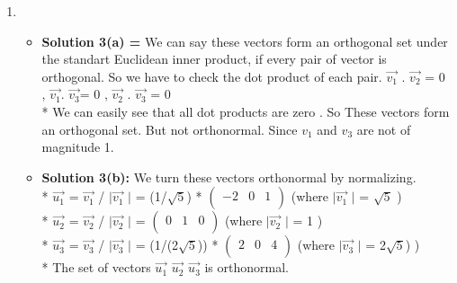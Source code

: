 \documentclass[11pt]{article}
\begin{document}
\begin{enumerate}
\item 
\begin{itemize}
    \item \textbf{Solution 3(a) = } We can say these vectors form an orthogonal set under the standart Euclidean inner product, if every pair of vector is orthogonal. So we have to check the dot product of each pair. $\vec{v_1}$ . $\vec{v_2}$ = 0 , $\vec{v_1}$. $\vec{v_3}$= 0 , $\vec{v_2}$ . $\vec{v_3}$ = 0 
    \\* We can easily see that all dot products are zero . So These vectors form an orthogonal set. But not orthonormal. Since  $v_1$ and $v_3$ are not of magnitude 1. 
    \item \textbf{Solution 3(b):} We turn these vectors orthonormal by normalizing. 
    \\* $\vec{u_1}$ =  $\vec{v_1}$  / $\mid \vec{v_1} $ $\mid$ = (1/$\sqrt{5}$) * 
$\begin  {pmatrix}
-2&0&1\\
\end{pmatrix}
$      (where $\mid \vec{v_1} $ $\mid$ = $\sqrt{5}$ )
    \\* $\vec{u_2}$ =  $\vec{v_2}$ / $\mid \vec{v_2} $ $\mid$ = $\begin  {pmatrix}
0&1&0\\
\end{pmatrix}
$  (where $\mid \vec{v_2} $ $\mid$ = 1 )
    \\* $\vec{u_3}$ =  $\vec{v_3}$ / $\mid \vec{v_3} $ $\mid$ = (1/(2$\sqrt{5}$)) * 
    $\begin  {pmatrix}
2&0&4\\
\end{pmatrix}
$  (where $\mid \vec{v_3} $ $\mid$ = 2$\sqrt{5}$) )
\\* The set of vectors $\vec{u_1}$ $\vec{u_2}$ $\vec{u_3}$ is orthonormal.

\end{itemize}



\end{enumerate}
\end{document}

